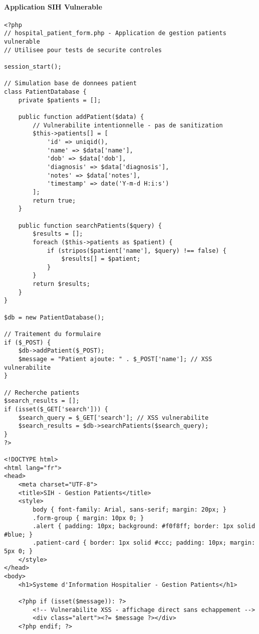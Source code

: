 \paragraph{Application SIH Vulnerable}
\begin{lstlisting}[style=bashstyle,caption=Application web medicale vulnerable pour tests XSS]
<?php
// hospital_patient_form.php - Application de gestion patients vulnerable
// Utilisee pour tests de securite controles

session_start();

// Simulation base de donnees patient
class PatientDatabase {
    private $patients = [];
    
    public function addPatient($data) {
        // Vulnerabilite intentionnelle - pas de sanitization
        $this->patients[] = [
            'id' => uniqid(),
            'name' => $data['name'],
            'dob' => $data['dob'], 
            'diagnosis' => $data['diagnosis'],
            'notes' => $data['notes'],
            'timestamp' => date('Y-m-d H:i:s')
        ];
        return true;
    }
    
    public function searchPatients($query) {
        $results = [];
        foreach ($this->patients as $patient) {
            if (stripos($patient['name'], $query) !== false) {
                $results[] = $patient;
            }
        }
        return $results;
    }
}

$db = new PatientDatabase();

// Traitement du formulaire
if ($_POST) {
    $db->addPatient($_POST);
    $message = "Patient ajoute: " . $_POST['name']; // XSS vulnerabilite
}

// Recherche patients
$search_results = [];
if (isset($_GET['search'])) {
    $search_query = $_GET['search']; // XSS vulnerabilite
    $search_results = $db->searchPatients($search_query);
}
?>

<!DOCTYPE html>
<html lang="fr">
<head>
    <meta charset="UTF-8">
    <title>SIH - Gestion Patients</title>
    <style>
        body { font-family: Arial, sans-serif; margin: 20px; }
        .form-group { margin: 10px 0; }
        .alert { padding: 10px; background: #f0f8ff; border: 1px solid #blue; }
        .patient-card { border: 1px solid #ccc; padding: 10px; margin: 5px 0; }
    </style>
</head>
<body>
    <h1>Systeme d'Information Hospitalier - Gestion Patients</h1>
    
    <?php if (isset($message)): ?>
        <!-- Vulnerabilite XSS - affichage direct sans echappement -->
        <div class="alert"><?= $message ?></div>
    <?php endif; ?>
    

\end{lstlisting}
